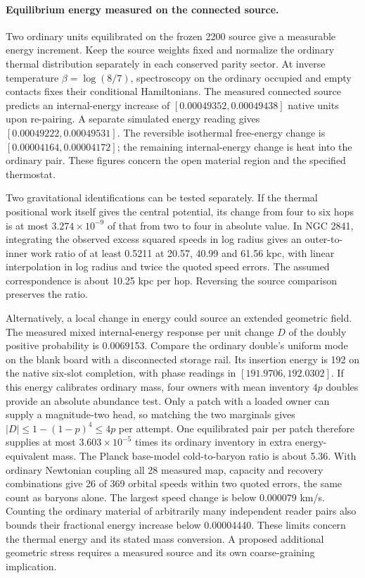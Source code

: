 \documentclass[11pt]{article}
\begin{document}
\paragraph{Equilibrium energy measured on the connected source.}
Two ordinary units equilibrated on the frozen 2200 source give a
measurable energy increment. Keep the source weights fixed and
normalize the ordinary thermal distribution separately in each
conserved parity sector. At inverse temperature $\beta=\log(8/7)$,
spectroscopy on the ordinary occupied and empty contacts fixes their
conditional Hamiltonians. The measured connected source predicts an
internal-energy increase of $[0.00049352,0.00049438]$ native units
upon re-pairing. A separate simulated energy reading gives
$[0.00049222,0.00049531]$. The reversible isothermal free-energy
change is $[0.00004164,0.00004172]$; the remaining internal-energy
change is heat into the ordinary pair. These figures concern the
open material region and the specified thermostat.

Two gravitational identifications can be tested separately. If the
thermal positional work itself gives the central potential, its
change from four to six hops is at most $3.274\times10^{-9}$ of that
from two to four in absolute value. In NGC 2841, integrating the
observed excess squared speeds in log radius gives an outer-to-inner
work ratio of at least 0.5211 at 20.57, 40.99 and 61.56 kpc, with
linear interpolation in log radius and twice the quoted speed errors.
The assumed correspondence is about 10.25 kpc per hop. Reversing the
source comparison preserves the ratio.

Alternatively, a local change in energy could source an extended
geometric field. The measured mixed internal-energy response per unit
change $D$ of the doubly positive probability is 0.0069153.
Compare the ordinary double's uniform mode on the blank board with
a disconnected storage rail. Its insertion energy is 192 on the
native six-slot completion, with phase readings in $[191.9706,192.0302]$.
If this energy calibrates ordinary mass, four owners with mean
inventory $4p$ doubles provide an absolute abundance test. Only a
patch with a loaded owner can supply a magnitude-two head, so
matching the two marginals gives $|D|\leq 1-(1-p)^4\leq4p$ per
attempt. One equilibrated pair per patch therefore supplies at most
$3.603\times10^{-5}$ times its ordinary inventory in extra
energy-equivalent mass. The Planck base-model cold-to-baryon ratio
is about 5.36. With ordinary Newtonian coupling all 28 measured
map, capacity and recovery combinations give 26 of 369 orbital
speeds within two quoted errors, the same count as baryons alone.
The largest speed change is below 0.000079 km/s. Counting the
ordinary material of arbitrarily many independent reader pairs
also bounds their fractional energy increase below 0.00004440.
These limits concern the thermal energy and its stated mass conversion.
A proposed additional geometric stress requires a measured source
and its own coarse-graining implication.
\end{document}
